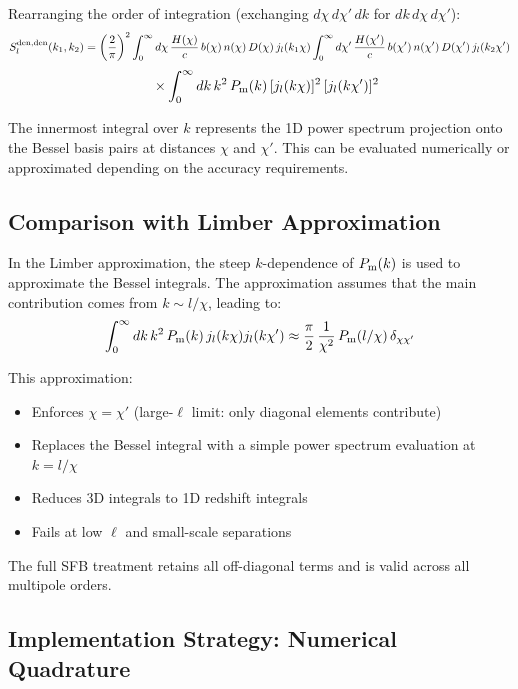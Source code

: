 Rearranging the order of integration (exchanging $d\chi \, d\chi' \, dk$ for $dk \, d\chi \, d\chi'$):
\begin{equation}
\label{eq:final_den_den_reordered}
S_l^{\rm den,den}(k_1, k_2) = \left(\frac{2}{\pi}\right)^2 \int_0^\infty d\chi \, \frac{H(\chi)}{c} \, b(\chi) \, n(\chi) \, D(\chi) \, j_l(k_1 \chi) \int_0^\infty d\chi' \, \frac{H(\chi')}{c} \, b(\chi') \, n(\chi') \, D(\chi') \, j_l(k_2 \chi')
\end{equation}
\begin{equation}
\quad \times \int_0^\infty dk \, k^2 \, P_{\rm m}(k) \, [j_l(k \chi)]^2 \, [j_l(k \chi')]^2
\end{equation}

The innermost integral over $k$ represents the 1D power spectrum projection onto the Bessel basis pairs at distances $\chi$ and $\chi'$. This can be evaluated numerically or approximated depending on the accuracy requirements.

\subsection{Comparison with Limber Approximation}

In the Limber approximation, the steep $k$-dependence of $P_{\rm m}(k)$ is used to approximate the Bessel integrals. The approximation assumes that the main contribution comes from $k \sim l/\chi$, leading to:
\begin{equation}
\label{eq:limber_approx}
\int_0^\infty dk \, k^2 \, P_{\rm m}(k) \, j_l(k \chi) j_l(k \chi') \approx \frac{\pi}{2} \, \frac{1}{\chi^2} \, P_{\rm m}(l/\chi) \, \delta_{\chi \chi'}
\end{equation}

This approximation:
\begin{itemize}
  \item Enforces $\chi = \chi'$ (large-$\ell$ limit: only diagonal elements contribute)
  \item Replaces the Bessel integral with a simple power spectrum evaluation at $k = l/\chi$
  \item Reduces 3D integrals to 1D redshift integrals
  \item Fails at low $\ell$ and small-scale separations
\end{itemize}

The full SFB treatment retains all off-diagonal terms and is valid across all multipole orders.

\subsection{Implementation Strategy: Numerical Quadrature}


